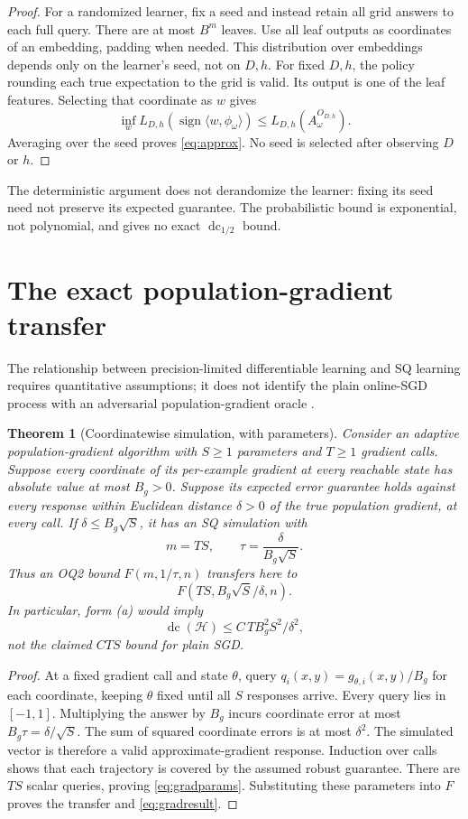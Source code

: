 \documentclass[11pt]{article}
\newtheorem{theorem}{Theorem}
\DeclareMathOperator{\dc}{dc}
\DeclareMathOperator{\sign}{sign}
\newcommand{\1}{\mathbf 1}
\newcommand{\cH}{\mathcal H}
\begin{document}
\begin{proof}
For a randomized learner, fix a seed and instead retain all grid answers to each full query. There are at most $B^m$ leaves. Use all leaf outputs as coordinates of an embedding, padding when needed. This distribution over embeddings depends only on the learner's seed, not on $D,h$. For fixed $D,h$, the policy rounding each true expectation to the grid is valid. Its output is one of the leaf features. Selecting that coordinate as $w$ gives
\[
 \inf_w L_{D,h}(\sign\langle w,\phi_\omega\rangle)
 \leq L_{D,h}(A_\omega^{O_{D,h}}).
\]
Averaging over the seed proves \eqref{eq:approx}. No seed is selected after observing $D$ or $h$.
\end{proof}

The deterministic argument does not derandomize the learner: fixing its seed need not preserve its expected guarantee. The probabilistic bound is exponential, not polynomial, and gives no exact $\dc_{1/2}$ bound.

\section{The exact population-gradient transfer}
The relationship between precision-limited differentiable learning and SQ learning requires quantitative assumptions; it does not identify the plain online-SGD process with an adversarial population-gradient oracle \citep{AKMSS21}.

\begin{theorem}[Coordinatewise simulation, with parameters]\label{thm:gradient}
Consider an adaptive population-gradient algorithm with $S\geq1$ parameters and $T\geq1$ gradient calls. Suppose every coordinate of its per-example gradient at every reachable state has absolute value at most $B_g>0$. Suppose its expected error guarantee holds against every response within Euclidean distance $\delta>0$ of the true population gradient, at every call. If $\delta\leq B_g\sqrt S$, it has an SQ simulation with
\begin{equation}\label{eq:gradparams}
 m=TS,\qquad \tau=\frac\delta{B_g\sqrt S}.
\end{equation}
Thus an OQ2 bound $F(m,1/\tau,n)$ transfers here to\[
 F(TS,B_g\sqrt S/\delta,n).
\]
In particular, form (a) would imply
\begin{equation}\label{eq:gradresult}
 \dc(\cH)\leq C\,T B_g^2 S^2/\delta^2,
\end{equation}
not the claimed $CTS$ bound for plain SGD.
\end{theorem}
\begin{proof}
At a fixed gradient call and state $\theta$, query
$q_i(x,y)=g_{\theta,i}(x,y)/B_g$ for each coordinate, keeping $\theta$ fixed until all $S$ responses arrive. Every query lies in $[-1,1]$. Multiplying the answer by $B_g$ incurs coordinate error at most $B_g\tau=\delta/\sqrt S$. The sum of squared coordinate errors is at most $\delta^2$. The simulated vector is therefore a valid approximate-gradient response. Induction over calls shows that each trajectory is covered by the assumed robust guarantee. There are $TS$ scalar queries, proving \eqref{eq:gradparams}. Substituting these parameters into $F$ proves the transfer and \eqref{eq:gradresult}.
\end{proof}
\end{document}
